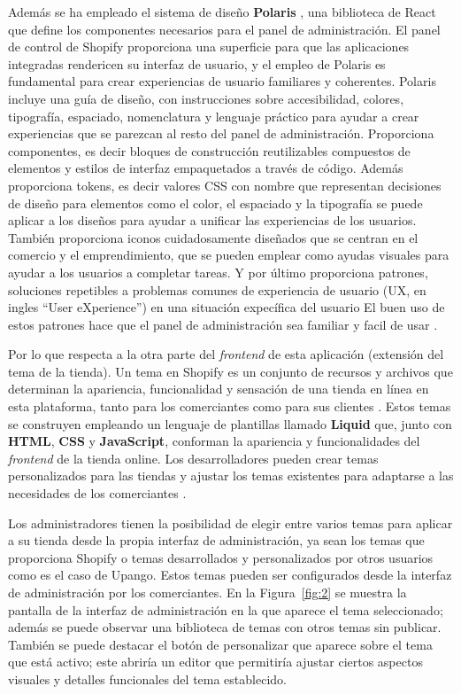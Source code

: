 \documentclass[12pt]{article}
\begin{document}
Además se ha empleado el sistema de diseño \textbf{Polaris} \cite{polaris}, una biblioteca de React que define los componentes necesarios para el panel de administración.
El panel de control de Shopify proporciona una superficie para que las aplicaciones integradas rendericen su interfaz de usuario, y el empleo de Polaris
es fundamental para crear experiencias de usuario familiares y coherentes.
Polaris incluye una guía de diseño, con instrucciones sobre accesibilidad, colores, tipografía, espaciado, nomenclatura y lenguaje práctico para ayudar 
a crear experiencias que se parezcan al resto del panel de administración. Proporciona componentes, es decir bloques de construcción reutilizables compuestos de 
elementos y estilos de interfaz empaquetados a través de código. Además proporciona tokens, es decir valores CSS con nombre que representan decisiones
de diseño para elementos como el color, el espaciado y la tipografía se puede aplicar a los diseños para ayudar a unificar las experiencias de los usuarios.
También proporciona iconos cuidadosamente diseñados que se centran en el comercio y el emprendimiento, que se pueden emplear como ayudas visuales para ayudar a los 
usuarios a completar tareas. Y por último proporciona patrones, soluciones repetibles a problemas comunes de experiencia de usuario (UX, en ingles ``User eXperience'') en una situación expecífica del usuario
El buen uso de estos patrones hace que el panel de administración sea familiar y facil de usar \cite{shopify-dev}.

Por lo que respecta a la otra parte del \textit{frontend} de esta aplicación (extensión del tema de la tienda). Un tema en Shopify es un conjunto de recursos
y archivos que determinan la apariencia, funcionalidad y sensación de una tienda en línea en esta plataforma, tanto para los comerciantes como para
sus clientes \cite{theme}. Estos temas se construyen empleando un lenguaje de plantillas llamado \textbf{Liquid} \cite{liquid} que, junto con \textbf{HTML}, \textbf{CSS} y \textbf{JavaScript}, conforman la apariencia
y funcionalidades del \textit{frontend} de la tienda online. Los desarrolladores pueden crear temas personalizados para las tiendas y ajustar los temas existentes 
para adaptarse a las necesidades de los comerciantes \cite{shopify-dev}. 

Los administradores tienen la posibilidad de elegir entre varios temas para aplicar a su tienda desde la propia interfaz de administración,
ya sean los temas que proporciona Shopify o temas desarrollados y personalizados por otros usuarios como es el caso de Upango. Estos temas pueden ser
configurados desde la interfaz de administración por los comerciantes.
En la Figura~\ref{fig:2} se muestra la pantalla de la interfaz de administración en la que aparece el tema seleccionado; además se puede observar una 
biblioteca de temas con otros temas sin publicar. También se puede destacar el botón de personalizar que aparece
sobre el tema que está activo; este abriría un editor que permitiría ajustar ciertos aspectos visuales y detalles funcionales del tema establecido.
\end{document}
